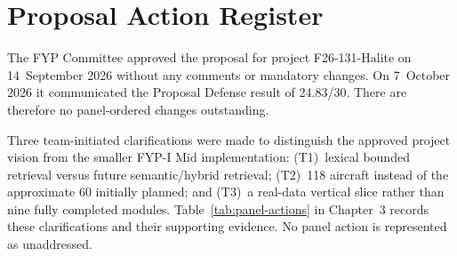 \chapter{Proposal Action Register}

The FYP Committee approved the proposal for project F26-131-Halite on 14~September 2026 without any comments or mandatory changes. On 7~October 2026 it communicated the Proposal Defense result of 24.83/30. There are therefore no panel-ordered changes outstanding.

Three team-initiated clarifications were made to distinguish the approved project vision from the smaller FYP-I Mid implementation: (T1)~lexical bounded retrieval versus future semantic/hybrid retrieval; (T2)~118 aircraft instead of the approximate 60 initially planned; and (T3)~a real-data vertical slice rather than nine fully completed modules. Table~\ref{tab:panel-actions} in Chapter~3 records these clarifications and their supporting evidence. No panel action is represented as unaddressed.
